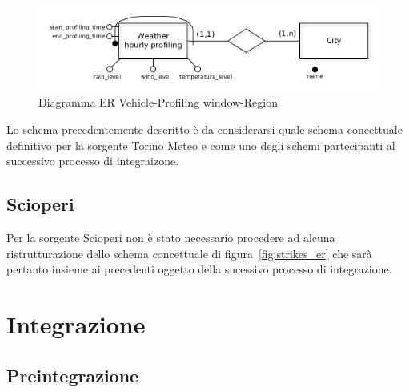 \begin{figure}[H]                                                                                                                                                            
\centering                                                                                                                                                                   
\includegraphics[width=\textwidth]{diagrams/wheathre_hourly_profiling_er}                                                                                                                                   
\caption{Diagramma ER Vehicle-Profiling window-Region}                                                                                                                                            
\label{fig:wheathre_hourly_profiling_er}                                                                                                                                                           
\end{figure}

Lo schema precedentemente descritto è da considerarsi quale schema concettuale definitivo
per la sorgente Torino Meteo e come uno degli schemi partecipanti al successivo processo di
integraizone.

\subsection{Scioperi}

Per la sorgente Scioperi non è stato necessario procedere ad alcuna ristrutturazione dello
schema concettuale di figura~\ref{fig:strikes_er} che sarà pertanto insieme ai precedenti
oggetto della sucessivo processo di integrazione.

\section{Integrazione}

\subsection{Preintegrazione}

